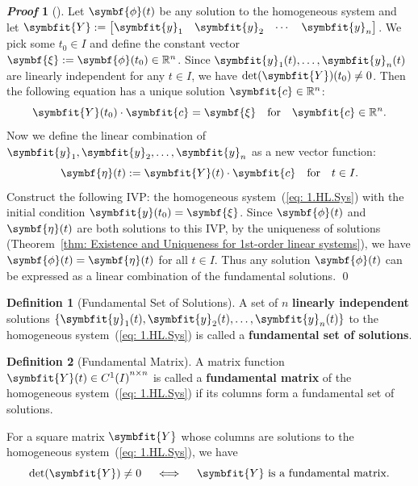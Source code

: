 \documentclass[10pt,UTF8]{article}
\newcommand{\mat}[1]{\symbfit{#1}}
\renewcommand{\vec}[1]{%
  \ifnum0\ifcat#1a1\else0\fi>0
  \symbfit{#1}  %
  \else
  \symbf{#1}  %
  \fi
}
\newenvironment{definitionBox}
{ \bigskip
  \begin{tcolorbox}[colback=blue!5!white,colframe=blue!75!black,parbox=false,before
  upper=\par,before lower=\par]}
  {
\end{tcolorbox}}
\theoremstyle{definition}
\newtheorem{definition inner}{Definition}[section]
\newenvironment{definition}[1][]
{
  \begin{definitionBox}
  \begin{definition inner}[#1]\hfill\par}
    {
    \end{definition inner}
\end{definitionBox}}
\theoremstyle{definition}
\newtheorem{theorem inner}{Theorem}[section]
\theoremstyle{definition}
\newtheorem*{proof inner}{\textit{Proof}}
\renewenvironment{proof}[1][]
{
\begin{proof inner}[#1]\hfill\par}
  {\qed\vphantom{.}
\end{proof inner}}
\theoremstyle{plain}
\newtheorem{tip inner}{Tip}[section]
\theoremstyle{remark}
\begin{document}
\begin{proof}
  Let \(\vec{\phi}(t)\) be any solution to the homogeneous system
  and let \(\mat{Y} :=
    \begin{bmatrix}
      \vec{y}_1 & \vec{y}_2 & \cdots & \vec{y}_n
  \end{bmatrix}\).
  We pick some \(t_0 \in I\) and define the constant vector
  \(\vec{\xi} := \vec{\phi}(t_0) \in \mathbb{R}^n\).
  Since \(\vec{y}_1(t), \ldots, \vec{y}_n(t)\) are
  linearly independent for any \(t \in I\),
  we have \(\det(\mat{Y})(t_0) \neq 0\).
  Then the following equation has a unique solution
  \(\vec{c} \in \mathbb{R}^n\):
  \begin{equation*}
    \mat{Y}(t_0) \cdot \vec{c} = \vec{\xi} \qfor \vec{c} \in \mathbb{R}^n.
  \end{equation*}
  Now we define the linear combination of
  \(\vec{y}_1, \vec{y}_2, \ldots, \vec{y}_n\)
  as a new vector function:
  \begin{equation*}
    \vec{\eta}(t) := \mat{Y}(t) \cdot \vec{c} \qfor t\in I.
  \end{equation*}
  Construct the following IVP\@:
  the homogeneous system~(\ref{eq: 1.HL.Sys})
  with the initial condition \(\vec{y}(t_0) = \vec{\xi}\).
  Since \(\vec{\phi}(t)\) and \(\vec{\eta}(t)\) are both solutions
  to this IVP, by the uniqueness of solutions
  (Theorem~\ref{thm: Existence and Uniqueness for 1st-order linear systems}),
  we have \(\vec{\phi}(t) = \vec{\eta}(t)\) for all \(t \in I\).
  Thus any solution \(\vec{\phi}(t)\) can be expressed as a linear
  combination of the fundamental solutions.
\end{proof}

\begin{definition}[Fundamental Set of Solutions]
  A set of \(n\) \textbf{linearly independent} solutions
  \( \{\vec{y}_1(t), \vec{y}_2(t), \ldots, \vec{y}_n(t)\} \)
  to the homogeneous system~(\ref{eq: 1.HL.Sys})
  is called a
  \textbf{fundamental set of solutions}.
\end{definition}

\begin{definition}[Fundamental Matrix]
  {}\label{def: Fundamental Matrix}
  A matrix function \(\mat{Y}(t) \in {C^1(I)}^{n \times n}\) is called a
  \textbf{fundamental matrix} of
  the homogeneous system~(\ref{eq: 1.HL.Sys})
  if its columns form a fundamental set of solutions.
\end{definition}

For a square matrix \(\mat{Y}\) whose columns are solutions
to the homogeneous system~(\ref{eq: 1.HL.Sys}),
we have
\begin{equation*}
  \det(\mat{Y}) \ne 0
  \quad\iff\quad
  \mat{Y} \text{ is a fundamental matrix}.
\end{equation*}
\end{document}
